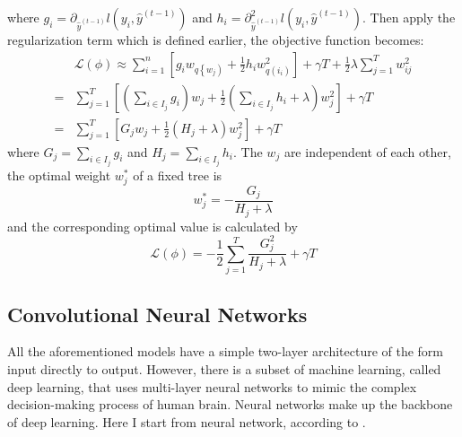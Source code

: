 \documentclass[12pt,a4paper,english
]{tunithesis}
\begin{document}
where $g_i=\partial_{\hat{y}^{(t-1)}} l\left(y_i, \hat{y}^{(t-1)}\right)$ and $h_i=\partial_{\hat{y}^{(t-1)}}^2 l\left(y_i, \hat{y}^{(t-1)}\right)$. Then apply the regularization term which is defined earlier, the objective function becomes:
\begin{equation}
    \begin{aligned}
& \mathcal{L}(\phi) \approx \sum_{i=1}^n\left[g_i w_{q\left\{w_j\right)}+\frac{1}{2} h_i w_{q\left(i_i\right)}^2\right]+\gamma T+\frac{1}{2} \lambda \sum_{j=1}^T w_{i j}^2 \\
= & \sum_{j=1}^T\left[\left(\sum_{i \in I_j} g_i\right) w_j+\frac{1}{2}\left(\sum_{i \in I_j} h_i+\lambda\right) w_j^2\right]+\gamma T \\
= & \sum_{j=1}^T\left[G_j w_j+\frac{1}{2}\left(H_j+\lambda\right) w_j^2\right]+\gamma T
\end{aligned}
\end{equation}
where $G_j=\sum_{i \in I_j} g_i $ and $H_j=\sum_{i \in I_j} h_i$. The $w_j$ are independent of each other, the optimal weight $w_j^*$ of a fixed tree is
\begin{equation}
w_j^*=-\frac{G_j}{H_j+\lambda}
\end{equation}
and the corresponding optimal value is calculated by
\begin{equation}
\mathcal{L}(\phi)=-\frac{1}{2} \sum_{j=1}^T \frac{G_j^2}{H_j+\lambda}+\gamma T
\end{equation}


\subsection{Convolutional Neural Networks}
All the aforementioned models have a simple two-layer architecture of the form input directly to output. However, there is a subset of machine learning, called deep learning, that uses multi-layer neural networks to mimic the complex decision-making process of human brain. Neural networks make up the backbone of deep learning. Here I start from neural network, according to \textcite{stanford_ml, stanford_cnn, xinyu2019, yamashita2018, veena2024}. 
\end{document}
